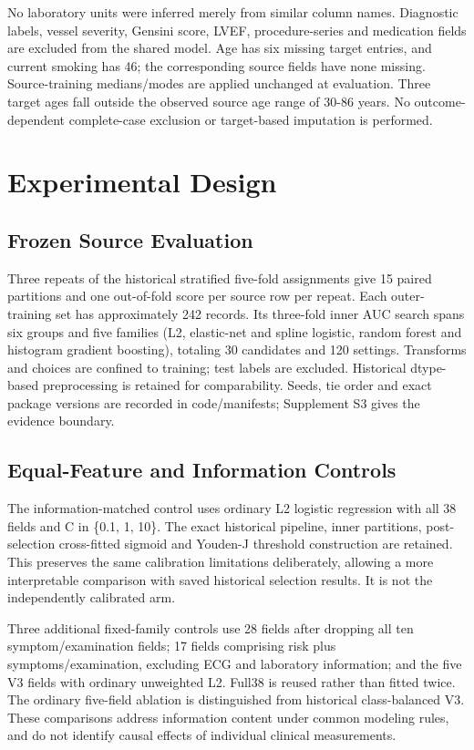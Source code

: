 \documentclass[conference,10pt]{IEEEtran}
\begin{document}
No laboratory units were inferred merely from similar column names. Diagnostic labels, vessel severity, Gensini score, LVEF, procedure-series and medication fields are excluded from the shared model. Age has six missing target entries, and current smoking has 46; the corresponding source fields have none missing. Source-training medians/modes are applied unchanged at evaluation. Three target ages fall outside the observed source age range of 30-86 years. No outcome-dependent complete-case exclusion or target-based imputation is performed.

\section{Experimental Design}
\subsection{Frozen Source Evaluation}
Three repeats of the historical stratified five-fold assignments give 15 paired partitions and one out-of-fold score per source row per repeat. Each outer-training set has approximately 242 records. Its three-fold inner AUC search spans six groups and five families (L2, elastic-net and spline logistic, random forest and histogram gradient boosting), totaling 30 candidates and 120 settings. Transforms and choices are confined to training; test labels are excluded. Historical dtype-based preprocessing is retained for comparability. Seeds, tie order and exact package versions are recorded in code/manifests; Supplement S3 gives the evidence boundary.

\subsection{Equal-Feature and Information Controls}
The information-matched control uses ordinary L2 logistic regression with all 38 fields and C in \{0.1, 1, 10\}. The exact historical pipeline, inner partitions, post-selection cross-fitted sigmoid and Youden-J threshold construction are retained. This preserves the same calibration limitations deliberately, allowing a more interpretable comparison with saved historical selection results. It is not the independently calibrated arm.

Three additional fixed-family controls use 28 fields after dropping all ten symptom/examination fields; 17 fields comprising risk plus symptoms/examination, excluding ECG and laboratory information; and the five V3 fields with ordinary unweighted L2. Full38 is reused rather than fitted twice. The ordinary five-field ablation is distinguished from historical class-balanced V3. These comparisons address information content under common modeling rules, and do not identify causal effects of individual clinical measurements.
\end{document}
